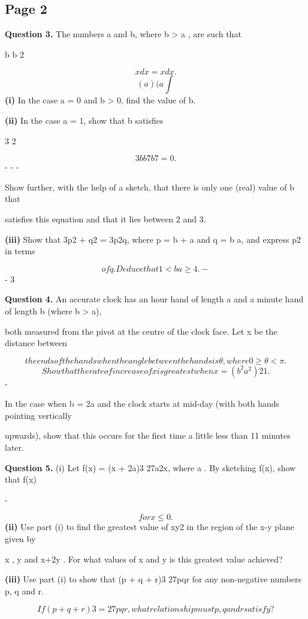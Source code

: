 \documentclass[12pt]{article}
\begin{document}
\subsection*{Page 2}
\begin{flushleft}
\bigskip\textbf{Question 3.} The numbers a and b, where b > a , are such that\par
b b 2\par
\[x dx = x dx .\]
\[(a )(a \int\]
\textbf{(i)} In the case a = 0 and b > 0, find the value of b.\par
\textbf{(ii)} In the case a = 1, show that b satisfies\par
3 2\par
\[3b b 7b 7 = 0 .\]
- - -\par
Show further, with the help of a sketch, that there is only one (real) value of b that\par
satisfies this equation and that it lies between 2 and 3.\par
\textbf{(iii)} Show that 3p2 + q2 = 3p2q, where p = b + a and q = b a, and express p2 in terms\par
\[of q. Deduce that 1 < b a \geq 4 . -\]
- 3\par
\bigskip\textbf{Question 4.} An accurate clock has an hour hand of length a and a minute hand of length b (where b > a),\par
both measured from the pivot at the centre of the clock face. Let x be the distance between\par
\[the ends of the hands when the angle between the hands is θ, where 0 \geq θ < \pi.\]
\[Show that the rate of increase of x is greatest when x = (b^2 a^2) 2 1 .\]
-\par
In the case when b = 2a and the clock starts at mid-day (with both hands pointing vertically\par
upwards), show that this occurs for the first time a little less than 11 minutes later.\par
\bigskip\textbf{Question 5.} (i) Let f(x) = (x + 2a)3 27a2x, where a . By sketching f(x), show that f(x) \par
-\par
\[for x \leq 0.\]
\textbf{(ii)} Use part (i) to find the greatest value of xy2 in the region of the x-y plane given by\par
x , y  and x+2y  . For what values of x and y is this greatest value achieved?\par
\textbf{(iii)} Use part (i) to show that (p + q + r)3 \leq 27pqr for any non-negative numbers p, q and r.\par
\[If (p + q + r)3 = 27pqr, what relationship must p, q and r satisfy?\]
\end{flushleft}
\end{document}
